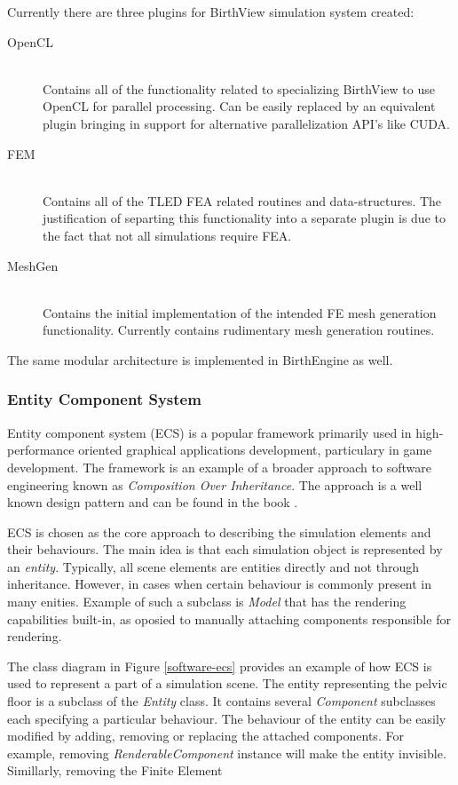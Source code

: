 Currently there are three plugins for BirthView simulation system created:


\begin{description}
  \item[OpenCL] \hfill \\
  Contains all of the functionality related to specializing BirthView to use OpenCL for parallel processing. Can be easily replaced by an equivalent plugin bringing in support for alternative parallelization API's like CUDA.
  \item[FEM] \hfill \\
  Contains all of the TLED FEA related routines and data-structures. The justification of separting this functionality into a separate plugin is due to the fact that not all simulations require FEA.
  \item[MeshGen] \hfill \\
  Contains the initial implementation of the intended FE mesh generation functionality. Currently contains rudimentary mesh generation routines.
\end{description}

The same modular architecture is implemented in BirthEngine as well.

\subsubsection{Entity Component System}

Entity component system (ECS) is a popular framework primarily used in high-performance oriented graphical applications development, particulary in game development. The framework is an example of a broader approach to software engineering known as \textit{Composition Over Inheritance}. The approach is a well known design pattern and can be found in the book \citep{Freeman:2004:HFD:1076324}.

ECS is chosen as the core approach to describing the simulation elements and their behaviours. The main idea is that each simulation object is represented by an \textit{entity}. Typically, all scene elements are entities directly and not through inheritance. However, in cases when certain behaviour is commonly present in many enities. Example of such a subclass is \textit{Model} that has the rendering capabilities built-in, as oposied to manually attaching components responsible for rendering.

The class diagram in Figure \ref{software-ecs} provides an example of how ECS is used to represent a part of a simulation scene. The entity representing the pelvic floor is a subclass of the \textit{Entity} class. It contains several \textit{Component} subclasses each specifying a particular behaviour. The behaviour of the entity can be easily modified by adding, removing or replacing the attached components. For example, removing \textit{RenderableComponent} instance will make the entity invisible. Simillarly, removing the Finite Element

